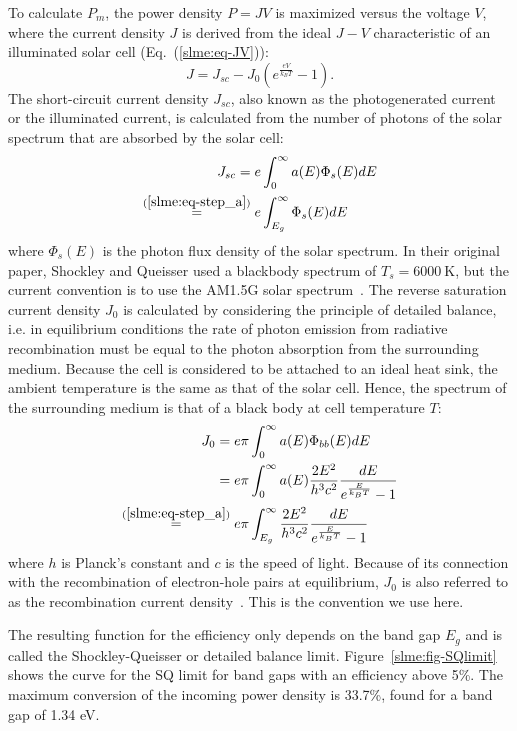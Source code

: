\begin{refsection}
To calculate $P_m$, the power density $P = JV$ is maximized versus the voltage 
$V$, where the current density $J$ is derived from the ideal $J-V$ 
characteristic of an illuminated solar cell (Eq.~(\ref{slme:eq-JV})): 
\begin{equation}\label{slme:eq-JV} 
J = J_{sc} - J_0 \left(e^{\frac{eV}{k_B T}} - 1\right). 
\end{equation} 
The short-circuit current density $J_{sc}$, also known as the photogenerated 
current or the illuminated current, is calculated from the number of photons 
of the solar spectrum that are absorbed by the solar cell: 
\begin{align} 
J_{sc} = e &\int_0^{\infty} a(E) \Phi_s (E) dE \\ 
\stackrel{(\ref{slme:eq-step_a})}{=} e &\int_{E_g}^{\infty} \Phi_s (E) dE 
\label{slme:eq-Ish} 
\end{align} 
where $\Phi_s(E)$ is the photon flux density of the solar spectrum. In their 
original paper, Shockley and Queisser used a blackbody spectrum of $T_s = 
6000~\si{\kelvin}$, but the current convention is to use the AM1.5G solar 
spectrum~\cite{International2012}.  The reverse saturation current density 
$J_0$ is calculated by considering the principle of detailed balance, i.e. in 
equilibrium conditions the rate of photon emission from radiative 
recombination must be equal to the photon absorption from the surrounding 
medium. Because the cell is considered to be attached to an ideal heat sink, 
the ambient temperature is the same as that of the solar cell. Hence, the 
spectrum of the surrounding medium is that of a black body at cell temperature 
$T$: 
\begin{align} 
J_0 = e \pi &\int_0^{\infty} a(E) \Phi_{bb}(E) dE\nonumber \\ 
= e \pi &\int_0^{\infty} a(E) \frac{2E^2}{h^3 c^2} \frac{dE}{e^{\frac{E}{k_B 
T}}-1} \\ 
\stackrel{(\ref{slme:eq-step_a})}{=} e \pi &\int_{E_g}^{\infty} 
\frac{2E^2}{h^3 c^2} \frac{dE}{e^{\frac{E}{k_B T}}-1} \label{slme:eq-I0} 
\end{align} 
where $h$ is Planck's constant and $c$ is the speed of light. Because of its 
connection with the recombination of electron-hole pairs at equilibrium, $J_0$ 
is also referred to as the recombination current density~\cite{Cuevas2014}. 
This is the convention we use here. 
 
The resulting function for the efficiency only depends on the band gap $E_g$ 
and is called the Shockley-Queisser or detailed balance limit. 
Figure~\ref{slme:fig-SQlimit} shows the curve for the SQ limit for band gaps 
with an efficiency above 5\%. The maximum conversion of the incoming power 
density is 33.7\%, found for a band gap of 1.34 eV. 
 

\end{refsection}
